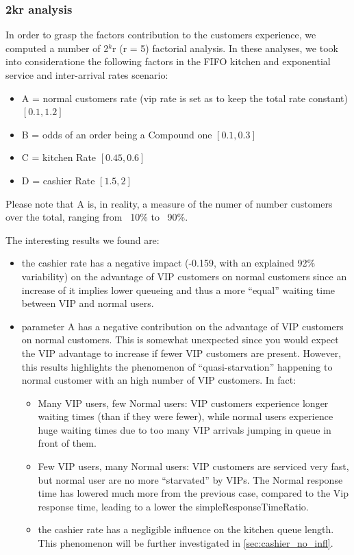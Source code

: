 \subsubsection{2kr analysis}
In order to grasp the factors contribution to the customers experience, we computed a number of 2$^k$r (r = 5) factorial analysis. In these analyses, we took into 
consideratione the following factors in the FIFO kitchen and exponential service and inter-arrival rates scenario: 
\begin{itemize}
  \item A = normal customers rate (vip rate is set as to keep the total rate constant) $[0.1, 1.2]$
  \item B = odds of an order being a Compound one $[0.1, 0.3]$
  \item C = kitchen Rate $[0.45, 0.6]$
  \item D = cashier Rate $[1.5, 2]$
\end{itemize}
Please note that A is, in reality, a measure of the numer of number customers 
over the total, ranging from ~10\% to ~90\%.

The interesting results we found are:
\begin{itemize}
  \item the cashier rate has a negative impact (-0.159, with an explained 92\%
   variability) on the advantage of VIP customers 
    on normal customers since an increase of it implies lower queueing and thus 
    a more ``equal'' waiting time between VIP and normal users.
  \item parameter A has a negative contribution on the advantage of VIP       
    customers on normal customers. This is somewhat unexpected since you would 
    expect the VIP advantage to increase if fewer VIP customers are present.
    However, this results highlights the phenomenon of ``quasi-starvation''
    happening to normal customer with an high number of VIP customers. In fact:
      \begin{itemize}
        \item Many VIP users, few Normal users: VIP customers experience longer 
          waiting times (than if they were fewer), while normal users experience huge waiting times due to too many VIP arrivals jumping in queue in front of them.
        \item Few VIP users, many Normal users: VIP customers are serviced very fast, but normal user are no more ``starvated'' by VIPs. The Normal response time has lowered much more from the previous case, compared to the Vip response time, leading to a lower the simpleResponseTimeRatio.
        \item the cashier rate has a negligible influence on the kitchen queue length. This phenomenon will be further investigated in \cref{sec:cashier_no_infl}.
      \end{itemize}
\end{itemize} %

